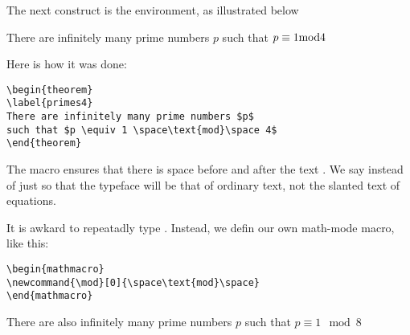 The next construct is the  environment, as illustrated below

\begin{theorem}
\label{primes4}
There are infinitely many prime numbers $p$ 
such that $p \equiv 1 \space\text{mod}\space 4$
\end{theorem}

Here is how it was done:

\begin{verbatim}
\begin{theorem}
\label{primes4}
There are infinitely many prime numbers $p$ 
such that $p \equiv 1 \space\text{mod}\space 4$
\end{theorem}
\end{verbatim}

The  macro ensures that there is space before and after the text .
We say  instead of just  so that the typeface will be that of ordinary text, not the slanted text of equations.  

It is awkard to repeatadly type .  Instead, we defin our own math-mode macro, like this:

\begin{verbatim}
\begin{mathmacro}
\newcommand{\mod}[0]{\space\text{mod}\space}
\end{mathmacro}
\end{verbatim}




\begin{mathmacro}
\newcommand{\mod}[0]{\space\text{mod}\space}
\end{mathmacro}

\begin{theorem}
\label{primes8}
There are also infinitely many prime numbers $p$ such that $p \equiv 1 \mod 8$
\end{theorem}